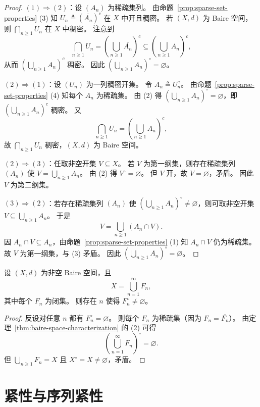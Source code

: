 \documentclass[lang=cn,a4paper,newtx,section]{elegantbook}
\begin{document}
\begin{proof}
  $(1)\Rightarrow(2)$：设 $(A_n)$ 为稀疏集列。
  由命题~\ref{prop:sparse-set-properties} (3) 知 $U_n\triangleq(\overline{A_n})^c$ 在 $X$ 中开且稠密。
  若 $(X,d)$ 为 Baire 空间，则 $\bigcap_{n\ge1}U_n$ 在 $X$ 中稠密。
  注意到
  \[
    \bigcap_{n\ge1}U_n=\left(\bigcup_{n\ge1}\overline{A_n}\right)^c\subseteq\left(\bigcup_{n\ge1}A_n\right)^c,
  \]
  从而 $\left(\bigcup_{n\ge1}A_n\right)^c$ 稠密。
  因此 $\left(\bigcup_{n\ge1}A_n\right)^\circ=\varnothing$。

  $(2)\Rightarrow(1)$：设 $(U_n)$ 为一列稠密开集。
  令 $A_n\triangleq U_n^c$。
  由命题~\ref{prop:sparse-set-properties} (4) 知每个 $A_n$ 为稀疏集。
  由 (2) 得 $\left(\bigcup_{n\ge1}A_n\right)^\circ=\varnothing$，即 $\left(\bigcup_{n\ge1}A_n\right)^c$ 稠密。
  又
  \[
    \bigcap_{n\ge1}U_n=\left(\bigcup_{n\ge1}A_n\right)^c,
  \]
  故 $\bigcap_{n\ge1}U_n$ 稠密，$(X,d)$ 为 Baire 空间。

  $(2)\Rightarrow(3)$：任取非空开集 $V\subseteq X$。
  若 $V$ 为第一纲集，则存在稀疏集列 $(A_n)$ 使 $V=\bigcup_{n\ge1}A_n$。
  由 (2) 得 $V^\circ=\varnothing$。
  但 $V$ 开，故 $V=\varnothing$，矛盾。
  因此 $V$ 为第二纲集。

  $(3)\Rightarrow(2)$：若存在稀疏集列 $(A_n)$ 使 $\left(\bigcup_{n\ge1}A_n\right)^\circ\ne\varnothing$，则可取非空开集 $V\subseteq\bigcup_{n\ge1}A_n$。
  于是
  \[
    V=\bigcup_{n\ge1}(A_n\cap V).
  \]
  因 $A_n\cap V\subseteq A_n$，由命题~\ref{prop:sparse-set-properties} (1) 知 $A_n\cap V$ 仍为稀疏集。
  故 $V$ 为第一纲集，与 (3) 矛盾。
  因此 $\left(\bigcup_{n\ge1}A_n\right)^\circ=\varnothing$。
\end{proof}

\begin{corollary}
  设 $(X,d)$ 为非空 Baire 空间，且
  \[
    X=\bigcup_{n=1}^{\infty}F_n,
  \]
  其中每个 $F_n$ 为闭集。
  则存在 $n$ 使得 $F_n^\circ\ne\varnothing$。
\end{corollary}

\begin{proof}
  反设对任意 $n$ 都有 $F_n^\circ=\varnothing$。
  则每个 $F_n$ 为稀疏集（因为 $F_n=\overline{F_n}$）。
  由定理~\ref{thm:baire-space-characterization} 的 (2) 可得
  \[
    \left(\bigcup_{n=1}^{\infty}F_n\right)^\circ=\varnothing.
  \]
  但 $\bigcup_{n\ge1}F_n=X$ 且 $X^\circ=X\ne\varnothing$，矛盾。
\end{proof}

\section{紧性与序列紧性}
\end{document}
